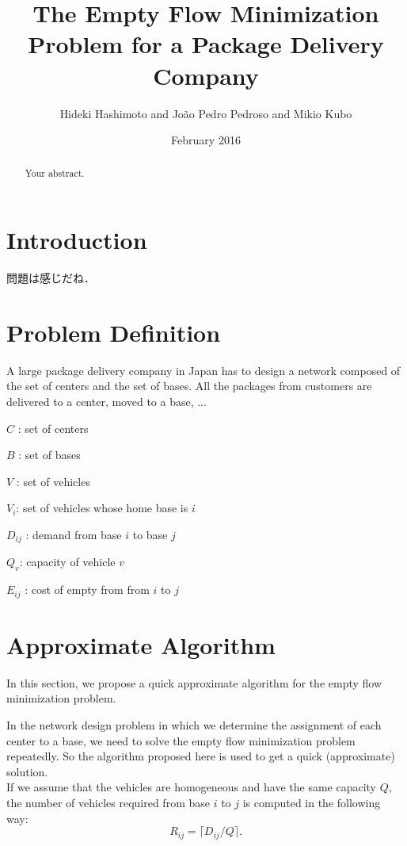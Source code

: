 \documentclass[a4paper]{bxjsarticle}
\title{The Empty Flow Minimization Problem for a Package Delivery Company}
\author{Hideki Hashimoto and Jo\~{a}o Pedro Pedroso and Mikio Kubo}
\date{February 2016	}
\begin{document}
\maketitle

\begin{abstract}
Your abstract.
\end{abstract}

\section{Introduction}


問題は感じだね．

\section{Problem Definition}

A large package delivery company in Japan has to design a network composed of the set of centers and the set of bases.
All the packages from customers are delivered to a center, moved to a base, ...


$C$ : set of centers

$B$ : set of bases 

$V$ : set of vehicles

$V_i$: set of vehicles whose home base is $i$

$D_{ij}$ : demand  from base $i$ to base $j$ 

$Q_v$: capacity of vehicle $v$ 

$E_{ij}$ : cost of empty from from $i$ to $j$ 


\section{Approximate Algorithm}


In this section, we propose a quick approximate algorithm for the empty flow minimization problem. 

In the network design problem in which we determine the assignment of each center to a base,
we need to solve the empty flow minimization problem repeatedly. 
So the algorithm proposed here is used to get a quick (approximate) solution. 
\[\]
If we assume  that the vehicles are homogeneous and have the same capacity $Q$, 
the number of vehicles required from base $i$ to $j$ is computed in the following way:
\[
 R_{ij} = \lceil D_{ij}/Q \rceil . 
\]
\end{document}
